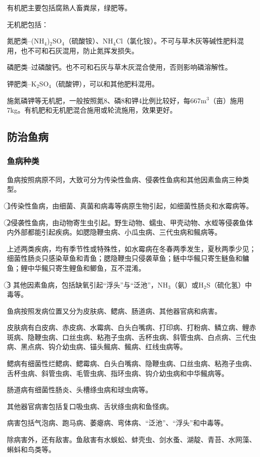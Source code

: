 \documentclass{ctexbook}
\begin{document}
有机肥主要包括腐熟人畜粪尿，绿肥等。

无机肥包括：

氮肥类--(NH$_4$)$_2$SO$_4$（硫酸铵）、NH$_4$Cl（氯化铵）。不可与草木灰等碱性肥料混用，也不可和石灰混用，防止氮挥发损失。

磷肥类--过磷酸钙。也不可和石灰与草木灰混合使用，否则影响磷溶解性。

钾肥类--K$_2$SO$_4$（硫酸钾），可以和其他肥料混用。

施氮磷钾等无机肥，一般按照氮8、磷8和钾4比例比较好，每667m$^{3}$（亩）施用7kg。有机肥和无机肥混合施用或轮流施用，效果更好。
\subsection{防治鱼病}
\subsubsection{鱼病种类}
鱼病按照病原不同，大致可分为传染性鱼病、侵袭性鱼病和其他因素鱼病三种类型。

\textcircled{1}传染性鱼病，由细菌、真菌和病毒等病原生物引起，如细菌性肠炎和水霉病等。

\textcircled{2}侵袭性鱼病，由动物寄生虫引起。野生动物、蠕虫、甲壳动物、水蛭等侵袭鱼体内外部都能引起疾病。如腮隐鞭虫病、小瓜虫病、三代虫病和鲺病等。

上述两类疾病，均有季节性或特殊性，如水霉病在冬春两季发生，夏秋两季少见；细菌性肠炎只感染草鱼和青鱼；腮隐鞭虫只侵袭草鱼；鲢中华鲺只寄生鲢鱼和鳙鱼；鲤中华鲺只寄生鲤鱼和鲫鱼，互不混淆。

\textcircled{3}
其他因素鱼病，包括缺氧引起“浮头”与“泛池”，NH$_3$（氨）或H$_2$S（硫化氢）中毒等。

鱼病按照发病位置又分为皮肤病、鳃病、肠道病、其他器官病和病害。

皮肤病有白皮病、赤皮病、水霉病、白头白嘴病、打印病、打粉病、鳞立病、鲤赤斑病、隐鞭虫病、口丝虫病、粘孢子虫病、舌杯虫病、斜管虫病、白点病、三代虫病、黑点病、钩介幼虫病、锚头鲺病、鲺病、红线虫病等。

鳃病有细菌性烂鳃病、鳃霉病、白头白嘴病、隐鞭虫病、口丝虫病、粘孢子虫病、舌杯虫病、斜管虫病、毛管虫病、指环虫病、钩介幼虫病和中华鲺病等。

肠道病有细菌性肠炎、头槽绦虫病和球虫病等。

其他器官病害包括复口吸虫病、舌状绦虫病和鱼怪病。

病害包括气泡病、跑马病、萎瘪病、弯体病、“泛池”、“浮头”和中毒等。

除病害外，还有敌害。鱼敌害有水蜈蚣、蚌壳虫、剑水蚤、湖靛、青苔、水网藻、蝌蚪和鸟类等。
\end{document}
